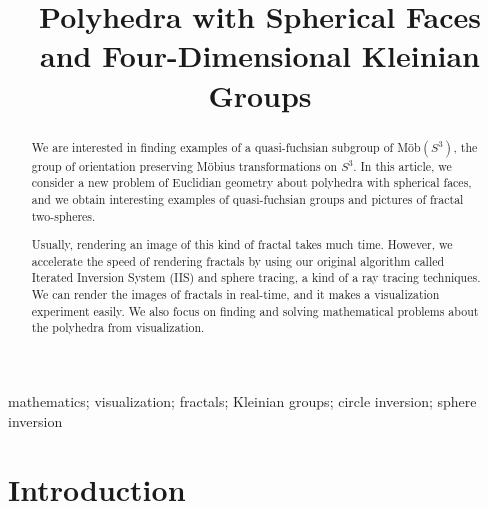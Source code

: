 \documentclass[suppldata, dvipdfmx]{interact}
\date{\empty}
\theoremstyle{plain}%
\theoremstyle{definition}
\theoremstyle{remark}
\theoremstyle{problemstyle}
\begin{document}

\title{Polyhedra with Spherical Faces and Four-Dimensional Kleinian Groups}

\author{
}

\maketitle

\begin{abstract}
 We are interested in finding examples of a quasi-fuchsian subgroup of
 M\"ob$(S^3)$, the group of orientation preserving M\"obius
 transformations on $S^3$. In this article, we consider a new problem of
 Euclidian geometry about polyhedra with spherical faces, and we obtain
 interesting examples of quasi-fuchsian groups and pictures of fractal
 two-spheres.

 Usually, rendering an image of this kind of fractal takes much time.
 However, we accelerate the speed of rendering fractals by
 using our original algorithm called Iterated Inversion System (IIS)
 and sphere tracing, a kind of a ray tracing techniques.
 We can render the images of fractals in real-time,
 and it makes a visualization experiment easily.
 We also focus on finding and solving mathematical problems about the
 polyhedra from visualization.

\end{abstract}

\begin{keywords}
mathematics; visualization; fractals; Kleinian groups; circle inversion;
 sphere inversion
\end{keywords}


\section{Introduction}
\end{document}
